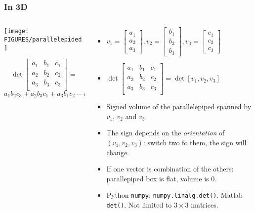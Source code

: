 \documentclass[8pt,dvipsnames]{beamer}
\newcommand{\numpy}{\texttt{numpy}}
\begin{document}
\begin{frame}
  \frametitle{In 3D}
  \begin{columns}
    \begin{column}{0.4\textwidth}
      \begin{center}
        \texttt{[image: FIGURES/parallelepided]}  
      \end{center}
       $$\det
      \begin{bmatrix}
        a_1 & b_1 & c_1\\
        a_2 & b_2 & c_2\\
        a_3 & b_3 & c_3\\
      \end{bmatrix}=
      $$
      $
      a_1 b_2 c_3 + a_2 b_3 c_1 + a_3 b_1 c_2 -a_2 b_1 c_3 -a_1 b_3 c_2 -a_3 b_2 c_1
      $
    \end{column}
    \begin{column}{0.6\textwidth}
      \begin{itemize}
      \item  $v_1 =
      \begin{bmatrix}
        a_1\\a_2\\a_3
      \end{bmatrix},
      v_2 =
      \begin{bmatrix}
        b_1\\b_2\\b_3
      \end{bmatrix}
      ,v_3 =
      \begin{bmatrix}
        c_1\\c_2\\c_3
      \end{bmatrix}$
    \item
      $\det
      \begin{bmatrix}
        a_1 & b_1 & c_1\\
        a_2 & b_2 & c_2\\
        a_3 & b_3 & c_3\\
      \end{bmatrix}
      = \det [v_1, v_2, v_3]
      $
      \item Signed volume of the parallelepiped spanned by $v_1$, $v_2$ and $v_3$.
      \item The sign depends on the \emph{orientation} of $(v_1,v_2,v_3)$: switch two fo them, the sign will change.
      \item If one vector is combination of the others: parallepiped box is flat, volume is 0.
      \item Python-\numpy{}: \texttt{numpy.linalg.det()}. Matlab \texttt{det()}. Not limited to $3\times 3$ matrices.
      \end{itemize}
    \end{column}
  \end{columns}
\end{frame}
\end{document}
